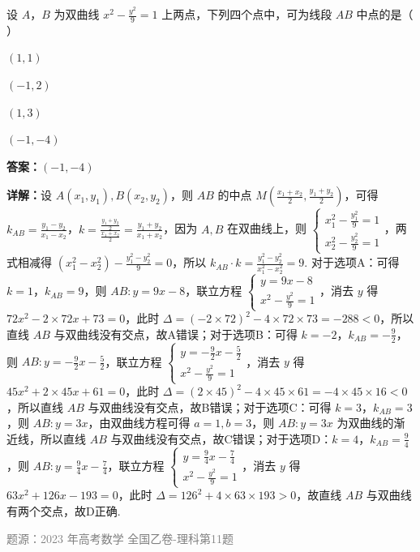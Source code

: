 \begin{question}
设 $A$，$B$ 为双曲线 $x^2-\frac{y^2}{9}=1$ 上两点，下列四个点中，可为线段 $AB$ 中点的是（ ）
\begin{choices}
\item $(1,1)$
\item $(-1,2)$
\item $(1,3)$
\item $(-1,-4)$
\end{choices}
\begin{solution}
\textbf{答案：}$(-1,-4)$

\textbf{详解：}设 $A(x_1,y_1),B(x_2,y_2)$，则 $AB$ 的中点 $M(\frac{x_1+x_2}{2},\frac{y_1+y_2}{2})$，可得 $k_{AB}=\frac{y_1-y_2}{x_1-x_2}$，$k=\frac{\frac{y_1+y_2}{2}}{\frac{x_1+x_2}{2}}=\frac{y_1+y_2}{x_1+x_2}$，因为 $A,B$ 在双曲线上，则 $\begin{cases} x_1^2-\frac{y_1^2}{9}=1 \\ x_2^2-\frac{y_2^2}{9}=1 \end{cases}$，两式相减得 $(x_1^2-x_2^2)-\frac{y_1^2-y_2^2}{9}=0$，所以 $k_{AB}\cdot k=\frac{y_1^2-y_2^2}{x_1^2-x_2^2}=9$. 对于选项A：可得 $k=1$，$k_{AB}=9$，则 $AB:y=9x-8$，联立方程 $\begin{cases} y=9x-8 \\ x^2-\frac{y^2}{9}=1 \end{cases}$，消去 $y$ 得 $72x^2-2\times72x+73=0$，此时 $\Delta=(-2\times72)^2-4\times72\times73=-288<0$，所以直线 $AB$ 与双曲线没有交点，故A错误；对于选项B：可得 $k=-2$，$k_{AB}=-\frac{9}{2}$，则 $AB:y=-\frac{9}{2}x-\frac{5}{2}$，联立方程 $\begin{cases} y=-\frac{9}{2}x-\frac{5}{2} \\ x^2-\frac{y^2}{9}=1 \end{cases}$，消去 $y$ 得 $45x^2+2\times45x+61=0$，此时 $\Delta=(2\times45)^2-4\times45\times61=-4\times45\times16<0$，所以直线 $AB$ 与双曲线没有交点，故B错误；对于选项C：可得 $k=3$，$k_{AB}=3$，则 $AB:y=3x$，由双曲线方程可得 $a=1,b=3$，则 $AB:y=3x$ 为双曲线的渐近线，所以直线 $AB$ 与双曲线没有交点，故C错误；对于选项D：$k=4$，$k_{AB}=\frac{9}{4}$，则 $AB:y=\frac{9}{4}x-\frac{7}{4}$，联立方程 $\begin{cases} y=\frac{9}{4}x-\frac{7}{4} \\ x^2-\frac{y^2}{9}=1 \end{cases}$，消去 $y$ 得 $63x^2+126x-193=0$，此时 $\Delta=126^2+4\times63\times193>0$，故直线 $AB$ 与双曲线有两个交点，故D正确.

\textcolor{gray}{\footnotesize 题源：2023 年高考数学 全国乙卷-理科第11题}
\end{solution}
\end{question}

